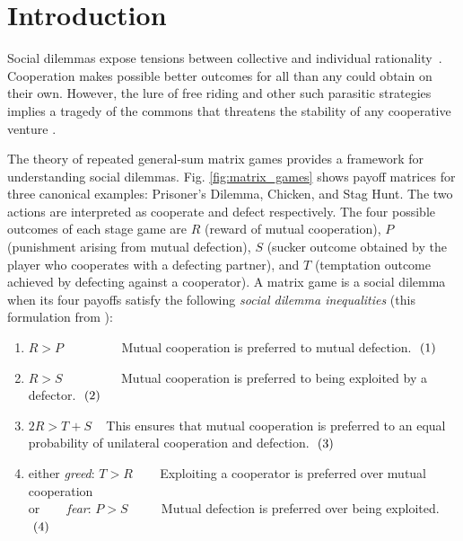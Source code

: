 \documentclass{aamas2017}
\newcommand\inlineeqno{\stepcounter{equation}\ (\theequation)}
\begin{document}


\section{Introduction}\label{sec:intro}


Social dilemmas expose tensions between collective and individual rationality~\cite{rapoport1974prisoner}. Cooperation makes possible better outcomes for all than any could obtain on their own. However, the lure of free riding and other such parasitic strategies implies a tragedy of the commons that threatens the stability of any cooperative venture \cite{van2013psychology}. 

The theory of repeated general-sum matrix games provides a framework for understanding social dilemmas. Fig. \ref{fig:matrix_games} shows payoff matrices for three canonical examples: Prisoner's Dilemma, Chicken, and Stag Hunt. The two actions are interpreted as cooperate and defect respectively. The four possible outcomes of each stage game are $R$ (reward of mutual cooperation), $P$ (punishment arising from mutual defection), $S$ (sucker outcome obtained by the player who cooperates with a defecting partner), and $T$ (temptation outcome achieved by defecting against a cooperator). A matrix game is a social dilemma when its four payoffs satisfy the following \emph{social dilemma inequalities} (this formulation from \cite{macy2002learning}):

\begin{enumerate}
 \item $R > P$  ~~~~~~~~ Mutual cooperation is preferred to mutual defection. \hfill $\label{eq:RgeP} \inlineeqno$
 \item $R > S$  ~~~~~~~~ Mutual cooperation is preferred to being exploited by a defector. \hfill $\label{eq:RgeS} \inlineeqno$
 \item $2R > T + S$ ~ This ensures that mutual cooperation is preferred to an equal probability of unilateral cooperation and defection. \hfill $\label{eq:noMixing} \inlineeqno$
 \item either \emph{greed}: $T > R$  ~~~ Exploiting a cooperator is preferred over mutual cooperation \\
       or ~~~ \emph{fear}:  $P > S$  ~~~~ Mutual defection is preferred over being exploited. \hfill $\label{eq:greedOrfear} \inlineeqno$
\end{enumerate}
\end{document}
